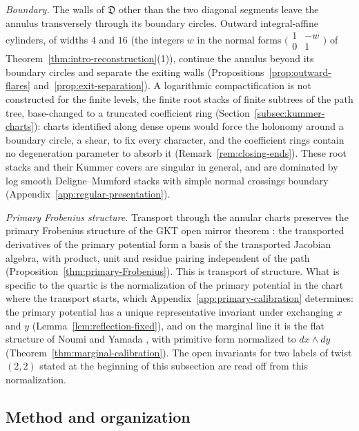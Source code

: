 \emph{Boundary.}  The walls of $\mathfrak D$ other than the two diagonal
segments leave the annulus transversely through its boundary circles.  Outward
integral-affine cylinders, of widths $4$ and $16$ (the integers $w$ in the
normal forms $\bigl(\begin{smallmatrix}1&-w\\0&1\end{smallmatrix}\bigr)$ of
Theorem~\ref{thm:intro-reconstruction}(1)), continue the annulus beyond
its boundary circles and separate the exiting walls
(Propositions~\ref{prop:outward-flares} and~\ref{prop:exit-separation}).  A
logarithmic compactification is not constructed for the finite levels, the
finite root stacks of finite subtrees of the path tree, base-changed to a
truncated coefficient ring (Section~\ref{subsec:kummer-charts}): charts
identified along dense opens would force
the holonomy around a boundary circle, a shear, to fix every character, and
the coefficient rings contain no degeneration parameter to absorb it
(Remark~\ref{rem:closing-ends}).  These root stacks and
their Kummer covers are singular in general, and are dominated by log smooth
Deligne--Mumford stacks with simple normal crossings boundary
(Appendix~\ref{app:regular-presentation}).

\emph{Primary Frobenius structure.}  Transport through the annular charts
preserves the primary Frobenius structure of the GKT open mirror theorem
\cite[Thm.~0.3, Cor.~4.17, Cor.~5.14]{grossetal2022open}: the transported
derivatives of the primary potential form a basis of the transported Jacobian
algebra, with product, unit and residue pairing independent of the path
(Proposition~\ref{thm:primary-Frobenius}).  This is transport of structure.
What is specific to the quartic is the normalization of the primary
potential in the chart where the transport starts, which
Appendix~\ref{app:primary-calibration} determines: the primary potential has
a unique representative invariant under exchanging $x$ and $y$
(Lemma~\ref{lem:reflection-fixed}), and on the marginal line it is the flat
structure of Noumi and Yamada \cite{noumiyamada1998flat}, with primitive form
normalized to $dx\wedge dy$ (Theorem~\ref{thm:marginal-calibration}).  The
open invariants for two labels of twist $(2,2)$ stated at the beginning
of this subsection are read off from this normalization.

\subsection{Method and organization}


